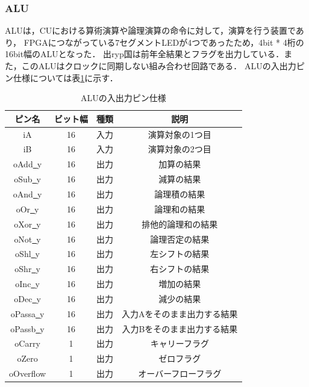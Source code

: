 \documentclass[a4paper,11pt]{ltjsarticle}
\begin{document}
\subsubsection{ALU}
ALUは，CUにおける算術演算や論理演算の命令に対して，演算を行う装置であり，
FPGAにつながっている7セグメントLEDが4つであったため，4bit * 4桁の16bit幅のALUとなった．
出ryp国は前年全結果とフラグを出力している．また，このALUはクロックに同期しない組み合わせ回路である．
ALUの入出力ピン仕様については表\ref{tab:alu}に示す．
\begin{table}[H]
    \centering
    \caption{ALUの入出力ピン仕様}
    \label{tab:alu}
    \begin{tabular}{|c|c|c|c|}
        \hline
        ピン名                  & ビット幅 & 種類 & 説明             \\
        \hline
        iA                   & 16   & 入力 & 演算対象の1つ目       \\
        \hline
        iB                   & 16   & 入力 & 演算対象の2つ目       \\
        \hline
        oAdd\underline{~}y   & 16   & 出力 & 加算の結果          \\
        \hline
        oSub\underline{~}y   & 16   & 出力 & 減算の結果          \\
        \hline
        oAnd\underline{~}y   & 16   & 出力 & 論理積の結果         \\
        \hline
        oOr\underline{~}y    & 16   & 出力 & 論理和の結果         \\
        \hline
        oXor\underline{~}y   & 16   & 出力 & 排他的論理和の結果      \\
        \hline
        oNot\underline{~}y   & 16   & 出力 & 論理否定の結果        \\
        \hline
        oShl\underline{~}y   & 16   & 出力 & 左シフトの結果        \\
        \hline
        oShr\underline{~}y   & 16   & 出力 & 右シフトの結果        \\
        \hline
        oInc\underline{~}y   & 16   & 出力 & 増加の結果          \\
        \hline
        oDec\underline{~}y   & 16   & 出力 & 減少の結果          \\
        \hline
        oPassa\underline{~}y & 16   & 出力 & 入力Aをそのまま出力する結果 \\
        \hline
        oPassb\underline{~}y & 16   & 出力 & 入力Bをそのまま出力する結果 \\
        \hline
        oCarry               & 1    & 出力 & キャリーフラグ        \\
        \hline
        oZero                & 1    & 出力 & ゼロフラグ          \\
        \hline
        oOverflow            & 1    & 出力 & オーバーフローフラグ     \\
        \hline
    \end{tabular}
\end{table}
\end{document}
